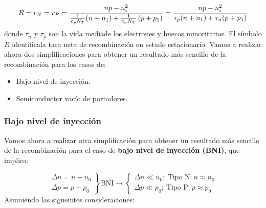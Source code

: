 \begin{equation}
	R=r_N=r_P = \frac{np-n_i^2}{\frac{1}{c_p N_T} (n+n_1) + \frac{1}{c_nN_T}\left( p+p_1 \right)} =
	\frac{np-n_i^2}{\tau_p(n+n_1)+\tau_n(p+p_1)}
\end{equation}
donde $\tau_n$ y $\tau_p$ son la vida mediade los electrones y huecos minoritarios. El símbolo $R$ identificala tasa neta de recombinación en estado estacionario. Vamos a realizar ahora dos simplificaciones para obtener un resultado más sencillo de la recombinación para los casos de:

\begin{itemize}
	\item Bajo nivel de inyección.
	\item Semiconductor vacío de portadores.
\end{itemize}

\subsubsection{Bajo nivel de inyección}

Vamos ahora a realizar otra simplificación para obtener un resultado más sencillo de la recombinación para el caso de \textbf{bajo nivel de inyección (BNI)}, que implica:

\begin{equation}
	\left.
	\begin{matrix}
		\Delta n = n - n_0 \\
		\Delta p = p - p_0
	\end{matrix}
	\right\rbrace
	\text{BNI} \rightarrow
	\left\lbrace
	\begin{matrix}
		\Delta n \ll n_0; \ \text{Tipo N:} \ n \approx n_0 \\
		\Delta p \ll p_0; \ \text{Tipo P:} \ p \approx p_0
	\end{matrix}
	\right.
\end{equation}
Asumiendo las sigueintes consideraciones:

